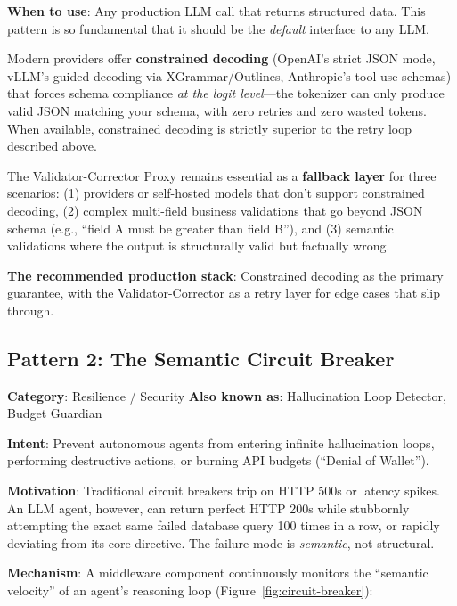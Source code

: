 \textbf{When to use}: Any production LLM call that returns structured data. This pattern is so fundamental that it should be the \emph{default} interface to any LLM.

\begin{tipbox}
Modern providers offer \textbf{constrained decoding} (OpenAI's strict JSON mode, vLLM's guided decoding via XGrammar/Outlines, Anthropic's tool-use schemas) that forces schema compliance \emph{at the logit level}---the tokenizer can only produce valid JSON matching your schema, with zero retries and zero wasted tokens. When available, constrained decoding is strictly superior to the retry loop described above.

The Validator-Corrector Proxy remains essential as a \textbf{fallback layer} for three scenarios: (1) providers or self-hosted models that don't support constrained decoding, (2) complex multi-field business validations that go beyond JSON schema (e.g., ``field A must be greater than field B''), and (3) semantic validations where the output is structurally valid but factually wrong.

\textbf{The recommended production stack}: Constrained decoding as the primary guarantee, with the Validator-Corrector as a retry layer for edge cases that slip through.
\end{tipbox}


\subsection{Pattern 2: The Semantic Circuit Breaker}

\textbf{Category}: Resilience / Security \hfill \textbf{Also known as}: Hallucination Loop Detector, Budget Guardian

\textbf{Intent}: Prevent autonomous agents from entering infinite hallucination loops, performing destructive actions, or burning API budgets (``Denial of Wallet'').

\textbf{Motivation}: Traditional circuit breakers trip on HTTP 500s or latency spikes. An LLM agent, however, can return perfect HTTP 200s while stubbornly attempting the exact same failed database query 100 times in a row, or rapidly deviating from its core directive. The failure mode is \emph{semantic}, not structural.

\textbf{Mechanism}: A middleware component continuously monitors the ``semantic velocity'' of an agent's reasoning loop (Figure~\ref{fig:circuit-breaker}):

